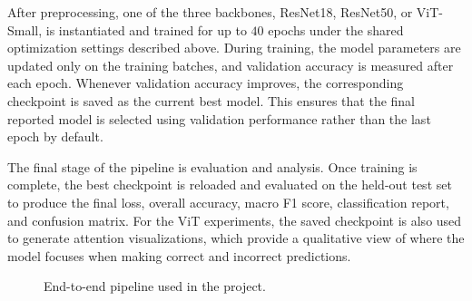\documentclass[11pt]{report}
\begin{document}
After preprocessing, one of the three backbones, ResNet18, ResNet50, or ViT-Small, is instantiated and trained for up to \(40\) epochs under the shared optimization settings described above. During training, the model parameters are updated only on the training batches, and validation accuracy is measured after each epoch. Whenever validation accuracy improves, the corresponding checkpoint is saved as the current best model. This ensures that the final reported model is selected using validation performance rather than the last epoch by default.

The final stage of the pipeline is evaluation and analysis. Once training is complete, the best checkpoint is reloaded and evaluated on the held-out test set to produce the final loss, overall accuracy, macro F1 score, classification report, and confusion matrix. For the ViT experiments, the saved checkpoint is also used to generate attention visualizations, which provide a qualitative view of where the model focuses when making correct and incorrect predictions.

\begin{figure}[h]
    \centering
    \caption{End-to-end pipeline used in the project.}
    \label{fig:pipeline}
\end{figure}
\end{document}
